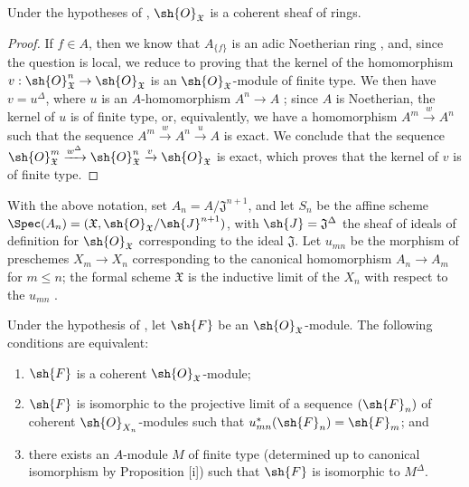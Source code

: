 \begin{proposition}[10.10.3]
\label{I.10.10.3}
Under the hypotheses of , $\sh{O}_\mathfrak{X}$ is a coherent sheaf of rings.
\end{proposition}

\begin{proof}
If $f\in A$, then we know that $A_{\{f\}}$ is an adic Noetherian ring , and, since the question is local, we reduce  to proving that the kernel of the homomorphism $v:\sh{O}_\mathfrak{X}^n\to\sh{O}_\mathfrak{X}$ is an $\sh{O}_\mathfrak{X}$-module of finite type.
We then have $v=u^\Delta$, where $u$ is an $A$-homomorphism $A^n\to A$ ; since $A$ is Noetherian, the kernel of $u$ is of finite type, or, equivalently, we have a homomorphism $A^m\xrightarrow{w}A^n$ such that the sequence $A^m\xrightarrow{w}A^n\xrightarrow{u}A$ is exact.
We conclude  that the sequence $\sh{O}_\mathfrak{X}^m\xrightarrow{w^\Delta}\sh{O}_\mathfrak{X}^n\xrightarrow{v}\sh{O}_\mathfrak{X}$ is exact, which proves that the kernel of $v$ is of finite type.
\end{proof}

\begin{env}[10.10.4]
\label{I.10.10.4}
With the above notation, set $A_n=A/\mathfrak{J}^{n+1}$, and let $S_n$ be the affine scheme $\Spec(A_n)=(\mathfrak{X},\sh{O}_\mathfrak{X}/\sh{J}^{n+1})$, with $\sh{J}=\mathfrak{J}^\Delta$ the sheaf of ideals of definition for $\sh{O}_\mathfrak{X}$ corresponding to the ideal $\mathfrak{J}$.
Let $u_{mn}$ be the morphism of preschemes $X_m\to X_n$ corresponding to the canonical homomorphism $A_n\to A_m$ for $m\leq n$; the formal scheme $\mathfrak{X}$ is the inductive limit of the $X_n$ with respect to the $u_{mn}$ .
\end{env}

\begin{proposition}[10.10.5]
\label{I.10.10.5}
Under the hypothesis of , let $\sh{F}$ be an $\sh{O}_\mathfrak{X}$-module.
The following conditions are equivalent:
\begin{enumerate}
  \item[\rm{(a)}] $\sh{F}$ is a coherent $\sh{O}_\mathfrak{X}$-module;
  \item[\rm{(b)}] $\sh{F}$ is isomorphic to the projective limit  of a sequence $(\sh{F}_n)$ of coherent $\sh{O}_{X_n}$-modules such that $u_{mn}^*(\sh{F}_n)=\sh{F}_m$; and
  \item[\rm{(c)}] there exists an $A$-module $M$ of finite type (determined up to canonical isomorphism by Proposition [i]) such that $\sh{F}$ is isomorphic to $M^\Delta$.
\end{enumerate}
\end{proposition}

